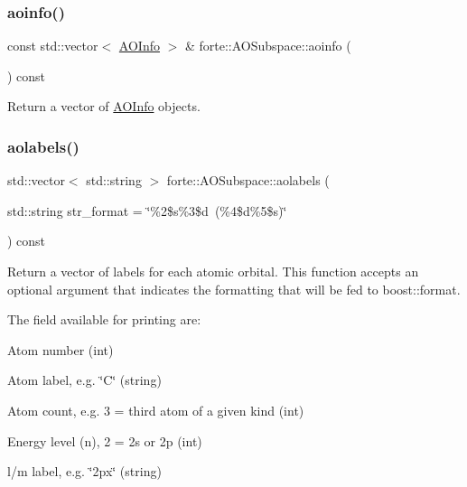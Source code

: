 \mbox{\label{classforte_1_1_a_o_subspace_a5dc3be78b487ed49979849d6826b2b04}} 
\subsubsection{\texorpdfstring{aoinfo()}{aoinfo()}}
{\footnotesize\ttfamily const std\+::vector$<$ \mbox{\hyperlink{classforte_1_1_a_o_info}{A\+O\+Info}} $>$ \& forte\+::\+A\+O\+Subspace\+::aoinfo (\begin{DoxyParamCaption}{ }\end{DoxyParamCaption}) const}



Return a vector of \mbox{\hyperlink{classforte_1_1_a_o_info}{A\+O\+Info}} objects. 

\mbox{\label{classforte_1_1_a_o_subspace_abe1ed4a268100d4ad84da0d67f1a7f00}} 
\subsubsection{\texorpdfstring{aolabels()}{aolabels()}}
{\footnotesize\ttfamily std\+::vector$<$ std\+::string $>$ forte\+::\+A\+O\+Subspace\+::aolabels (\begin{DoxyParamCaption}\item[{std\+::string}]{str\+\_\+format = {\ttfamily \char`\"{}\%2\$s\%3\$d~(\%4\$d\%5\$s)\char`\"{}} }\end{DoxyParamCaption}) const}

Return a vector of labels for each atomic orbital. This function accepts an optional argument that indicates the formatting that will be fed to boost\+::format.

The field available for printing are\+:
\begin{DoxyEnumerate}
\item Atom number (int)
\item Atom label, e.\+g. \char`\"{}\+C\char`\"{} (string)
\item Atom count, e.\+g. 3 = third atom of a given kind (int)
\item Energy level (n), 2 = 2s or 2p (int)
\item l/m label, e.\+g. \char`\"{}2px\char`\"{} (string)
\end{DoxyEnumerate}

